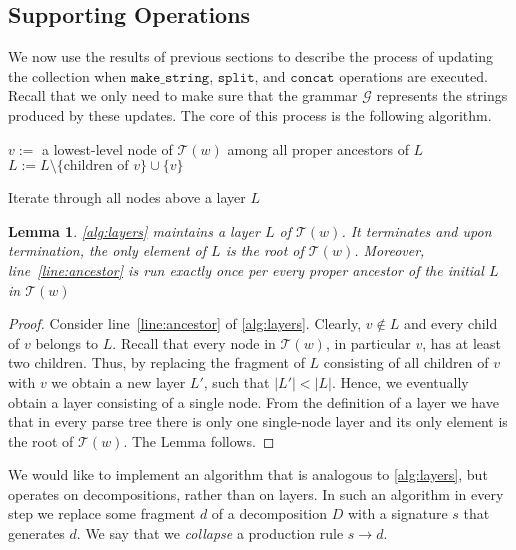 \documentclass[a4paper]{article}
\newtheorem{lemma}[theorem]{Lemma}
\theoremstyle{remark}
\newcommand{\makeop}{\mathtt{make\_string}}
\newcommand{\concop}{\mathtt{concat}}
\newcommand{\splitop}{\mathtt{split}}
\newcommand{\str}{w}
\newcommand{\grammar}{\mathcal{G}}
\newcommand{\decomp}{D}
\newcommand{\stree}{\mathcal{T}}
\begin{document}
\subsection{Supporting Operations}
We now use the results of previous sections to describe the process of updating the collection
when $\makeop$, $\splitop$, and $\concop$ operations are executed.
Recall that we only need to make sure that the grammar $\grammar$
represents the strings produced by these updates.
The core of this process is the following algorithm.

\begin{algorithm}
\begin{algorithmic}[1]
\State $v := $ a lowest-level node of $\stree(\str)$ among all proper ancestors of $L$\label{line:ancestor}
\State $L := L \setminus \{\textrm{children of } v\} \cup \{v\}$
\EndWhile
\EndFunction
\end{algorithmic}
\caption{Iterate through all nodes above a layer $L$}
\label{alg:layers}
\end{algorithm}

\begin{lemma}
\cref{alg:layers} maintains a layer $L$ of $\stree(\str)$.
It terminates and upon termination, the only element of $L$ is the root of $\stree(\str)$.
Moreover, line~\ref{line:ancestor} is run exactly once per every proper ancestor of the initial $L$ in $\stree(\str)$
\end{lemma}

\begin{proof}
Consider line~\ref{line:ancestor} of \cref{alg:layers}.
Clearly, $v \not\in L$ and every child of $v$ belongs to $L$.
Recall that every node in $\stree(w)$, in particular $v$, has at least two children.
Thus, by replacing the fragment of $L$ consisting of all children of $v$ with $v$ we obtain a new layer $L'$, such that $|L'| < |L|$.
Hence, we eventually obtain a layer consisting of a single node.
From the definition of a layer we have that in every parse tree there is only one single-node layer and its only element is the root of $\stree(w)$.
The Lemma follows.
\end{proof}

We would like to implement an algorithm that is analogous to \cref{alg:layers}, but operates on decompositions, rather than on layers.
In such an algorithm in every step we replace some fragment $d$ of a decomposition $\decomp$ with a signature $s$ that generates $d$.
We say that we \emph{collapse} a production rule $s \rightarrow d$.
\end{document}
